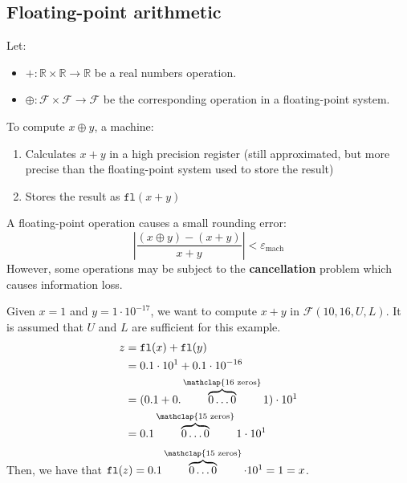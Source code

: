 \subsection{Floating-point arithmetic}
Let:
\begin{itemize}
    \item $+: \mathbb{R} \times \mathbb{R} \rightarrow \mathbb{R}$ be a real numbers operation.
    \item $\oplus: \mathcal{F} \times \mathcal{F} \rightarrow \mathcal{F}$ be the corresponding operation in a floating-point system.
\end{itemize}
%
To compute $x \oplus y$, a machine:
\begin{enumerate}
    \item Calculates $x + y$ in a high precision register 
        (still approximated, but more precise than the floating-point system used to store the result)
    \item Stores the result as $\texttt{fl}(x + y)$
\end{enumerate}

A floating-point operation causes a small rounding error:
\[
    \left\vert \frac{(x \oplus y) - (x + y)}{x+y} \right\vert < \varepsilon_{\text{mach}}
\]
%
However, some operations may be subject to the \textbf{cancellation} problem which causes information loss.
\begin{example}
    Given $x = 1$ and $y = 1 \cdot 10^{-17}$, we want to compute $x + y$ in $\mathcal{F}(10, 16, U, L)$.
    It is assumed that $U$ and $L$ are sufficient for this example.
    \begin{equation*}
        \begin{split}
            z & = \texttt{fl}(x) + \texttt{fl}(y) \\
              & = 0.1 \cdot 10^1 + 0.1 \cdot 10^{-16} \\
              & = (0.1 + 0.\overbrace{0\dots0}^{\mathclap{16\text{ zeros}}}1) \cdot 10^1 \\
              & = 0.1\overbrace{0\dots0}^{\mathclap{15\text{ zeros}}}1 \cdot 10^1
        \end{split}
    \end{equation*}
    Then, we have that $\texttt{fl}(z) = 0.1\overbrace{0\dots0}^{\mathclap{15\text{ zeros}}} \cdot 10^1 = 1 = x$.
\end{example}
